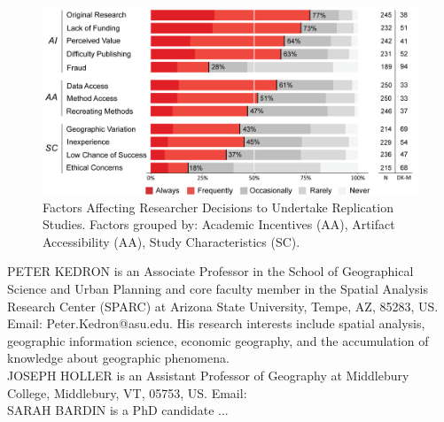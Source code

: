 \documentclass[]{interact}
\theoremstyle{plain}%
\theoremstyle{definition}
\theoremstyle{remark}
\begin{document}
\newpage

\begin{figure}[hbt!]
    \centering
    \includegraphics[scale=0.80]{results/figures/Fig-Q15-Decisions.png}
    \caption{Factors Affecting Researcher Decisions to Undertake Replication Studies. Factors grouped by: Academic Incentives (AA), Artifact Accessibility (AA), Study Characteristics (SC).}
    \label{fig:Q15-DecisionFactors}
\end{figure}

\newpage
\noindent PETER KEDRON is an Associate Professor in the School of Geographical Science and Urban Planning and core faculty member in the Spatial Analysis Research Center (SPARC) at Arizona State University, Tempe, AZ, 85283, US. Email: Peter.Kedron@asu.edu. His research interests include spatial analysis, geographic information science, economic geography, and the accumulation of knowledge about geographic phenomena. \\  
  
\noindent JOSEPH HOLLER is an Assistant Professor of Geography at Middlebury College, Middlebury, VT, 05753, US. Email: \\
  
\noindent SARAH BARDIN is a PhD candidate ...
\end{document}
